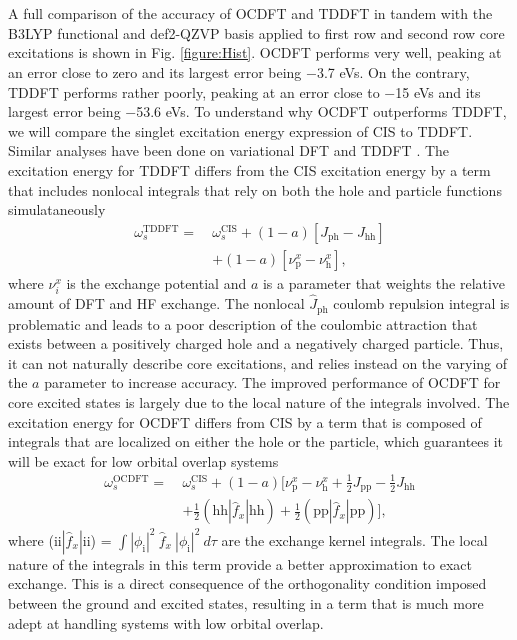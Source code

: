\documentclass[12pt]{article}
\begin{document}
\\ \\
A full comparison of the accuracy of OCDFT and TDDFT in tandem with the B3LYP functional and def2-QZVP basis applied to first row and second row core excitations is shown in Fig. \ref{figure:Hist}. OCDFT performs very well, peaking at an error close to zero and its largest error being $-$3.7 eVs. On the contrary, TDDFT performs rather poorly, peaking at an error close to $-$15 eVs and its largest error being $-$53.6 eVs. To understand why OCDFT outperforms TDDFT, we will compare the singlet excitation energy expression of CIS to TDDFT. Similar analyses have been done on variational DFT \cite{ziegler_implementation_2012} and TDDFT \cite{casida_charge-transfer_2000}. The excitation energy for TDDFT differs from the CIS excitation energy by a term that includes nonlocal integrals that rely on both the hole and particle functions simulataneously
\begin{align}
 \nonumber \omega^{\text{TDDFT}}_s = \ &\omega^{\text{CIS}}_s + (1 - a) [J_{\text{ph}} - J_{\text{hh}}] \\ &+ (1 - a) [\nu_{\text{p}}^x - \nu_{\text{h}}^x] ,
\end{align}
where $\nu_i^x$ is the exchange potential and $a$ is a parameter that weights the relative amount of DFT and HF exchange. The nonlocal $\hat{J}_{\text{ph}}$ coulomb repulsion integral is problematic and leads to a poor description of the coulombic attraction that exists between a positively charged hole and a negatively charged particle. Thus, it can not naturally describe core excitations, and relies instead on the varying of the $a$ parameter to increase accuracy. The improved performance of OCDFT for core excited states is largely due to the local nature of the integrals involved. The excitation energy for OCDFT differs from CIS by a term that is composed of integrals that are localized on either the hole or the particle, which guarantees it will be exact for low orbital overlap systems
\begin{align}
\nonumber \omega^{\text{OCDFT}}_s = \ &\omega^{\text{CIS}}_s + (1 - a) [\nu_{\text{p}}^x - \nu_{\text{h}}^x + \frac{1}{2} J_{\text{pp}} - \frac{1}{2} J_{\text{hh}} \\
&+ \frac{1}{2} (\text{hh}|\hat{f}_x|\text{hh}) +\frac{1}{2} (\text{pp}|\hat{f}_x|\text{pp})] ,
\end{align}
where (ii$|\hat{f}_x|$ii) = $\int |\phi_{\text{i}}|^2\ \hat{f}_x\  |\phi_{\text{i}}|^2 \ d\tau$ are the exchange kernel integrals. The local nature of the integrals in this term provide a better approximation to exact exchange. This is a direct consequence of the orthogonality condition imposed between the ground and excited states, resulting in a term that is much more adept at handling systems with low orbital overlap.
\end{document}
